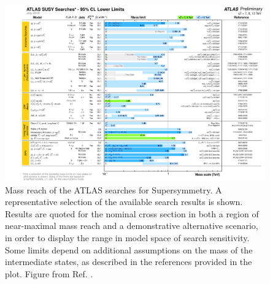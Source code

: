 \begin{figure}[htb]
	\centering
	\includegraphics[width=1.1\textwidth]{figures/summary_plots/ATLAS_SUSY_Summary.pdf}
	\caption{Mass reach of the ATLAS searches for Supersymmetry. 
	A representative selection of the available search results is shown. Results are quoted for the nominal cross section 
	in both a region of near-maximal mass reach and a demonstrative alternative scenario, in order to display the range in 
	model space of search sensitivity. Some limits depend on additional assumptions on the mass of the intermediate states, 
	as described in the references provided in the plot. Figure from Ref. \cite{atlasSUSYSummary}.
	} 
	\label{fig:summary_atlas_summary}
\end{figure}

